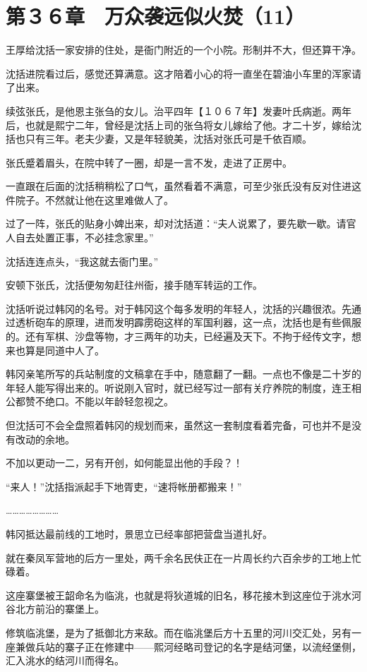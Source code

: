 \section{第３６章　万众袭远似火焚（11） }

王厚给沈括一家安排的住处，是衙门附近的一个小院。形制并不大，但还算干净。

沈括进院看过后，感觉还算满意。这才陪着小心的将一直坐在碧油小车里的浑家请了出来。

续弦张氏，是他恩主张刍的女儿。治平四年【１０６７年】发妻叶氏病逝。两年后，也就是熙宁二年，曾经是沈括上司的张刍将女儿嫁给了他。才二十岁，嫁给沈括也只有三年。老夫少妻，又是年轻貌美，沈括对张氏可是千依百顺。

张氏蹙着眉头，在院中转了一圈，却是一言不发，走进了正房中。

一直跟在后面的沈括稍稍松了口气，虽然看着不满意，可至少张氏没有反对住进这件院子。不然就让他在这里难做人了。

过了一阵，张氏的贴身小婢出来，却对沈括道：“夫人说累了，要先歇一歇。请官人自去处置正事，不必挂念家里。”

沈括连连点头，“我这就去衙门里。”

安顿下张氏，沈括便匆匆赶往州衙，接手随军转运的工作。

沈括听说过韩冈的名号。对于韩冈这个每多发明的年轻人，沈括的兴趣很浓。先通过透析砲车的原理，进而发明霹雳砲这样的军国利器，这一点，沈括也是有些佩服的。还有军棋、沙盘等物，才三两年的功夫，已经遍及天下。不拘于经传文字，想来也算是同道中人了。

韩冈亲笔所写的兵站制度的文稿拿在手中，随意翻了一翻。一点也不像是二十岁的年轻人能写得出来的。听说刚入官时，就已经写过一部有关疗养院的制度，连王相公都赞不绝口。不能以年龄轻忽视之。

但沈括可不会全盘照着韩冈的规划而来，虽然这一套制度看着完备，可也并不是没有改动的余地。

不加以更动一二，另有开创，如何能显出他的手段？！

“来人！”沈括指派起手下地胥吏，“速将帐册都搬来！”

……………………

韩冈抵达最前线的工地时，景思立已经率部把营盘当道扎好。

就在秦凤军营地的后方一里处，两千余名民伕正在一片周长约六百余步的工地上忙碌着。

这座寨堡被王韶命名为临洮，也就是将狄道城的旧名，移花接木到这座位于洮水河谷北方前沿的寨堡上。

修筑临洮堡，是为了抵御北方来敌。而在临洮堡后方十五里的河川交汇处，另有一座兼做兵站的寨子正在修建中——熙河经略司登记的名字是结河堡，以流经堡侧，汇入洮水的结河川而得名。

